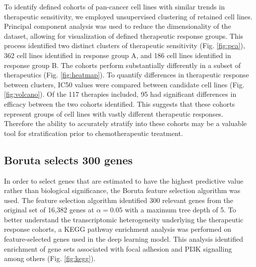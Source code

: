 \documentclass[10pt, letterpaper]{article}
\begin{document}
\begin{multicols*}{2}
To identify defined cohorts of pan-cancer cell lines with similar trends in therapeutic sensitivity, we employed unsupervised clustering of retained cell lines. Principal component analysis was used to reduce the dimensionality of the dataset, allowing for visualization of defined therapeutic response groups. This process identified two distinct clusters of therapeutic sensitivity (Fig. \ref{fig:pca}), 362 cell lines identified in response group A, and 186 cell lines identified in response group B. The cohorts perform substantially differently in a subset of therapeutics (Fig. \ref{fig:heatmap}). To quantify differences in therapeutic response between clusters, IC50 values were compared between candidate cell lines (Fig. \ref{fig:volcano}). Of the 117 therapies included, 95 had significant differences in efficacy between the two cohorts identified. This suggests that these cohorts represent groups of cell lines with vastly different therapeutic responses. Therefore the ability to accurately stratify into these cohorts may be a valuable tool for stratification prior to chemotherapeutic treatment. 


\subsection*{Boruta selects 300 genes}
In order to select genes that are estimated to have the highest predictive value rather than biological significance, the Boruta feature selection algorithm was used. The feature selection algorithm identified 300 relevant genes from the original set of 16,382 genes at $\alpha=0.05$ with a maximum tree depth of 5. To better understand the transcriptomic heterogeneity underlying the therapeutic response cohorts, a KEGG pathway enrichment analysis was performed on feature-selected genes used in the deep learning model. This analysis identified enrichment of gene sets associated with focal adhesion and PI3K signalling among others (Fig. \ref{fig:kegg}).



\end{multicols*}
\end{document}
